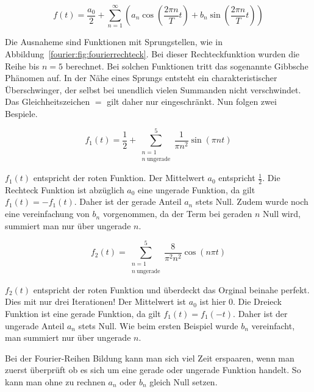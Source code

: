\begin{equation}
f(t) = \frac{a_0}{2} + \sum_{n=1}^{\infty} \left( a_n \cos\left( \frac{2\pi n}{T} t \right) + b_n \sin\left( \frac{2\pi n}{T} t \right) \right)
\end{equation}


Die Ausnaheme sind Funktionen mit Sprungstellen, wie in Abbildung~\ref{fourier:fig:fourierrechteck}.
Bei dieser Rechteckfunktion wurden die Reihe bis $n = 5$ berechnet. 
Bei solchen Funktionen tritt das sogenannte Gibbsche Phänomen auf.
In der Nähe eines Sprungs entsteht ein charakteristischer Überschwinger, der selbst bei unendlich vielen Summanden nicht verschwindet.
Das Gleichheitszeichen $=$ gilt daher nur eingeschränkt. 
Nun folgen zwei Bespiele.



\begin{equation}
	f_1(t) = \frac{1}{2} + \sum_{\substack{n=1 \\ n\ \text{ungerade}}}^{5} \frac{1}{\pi n^2} \sin\left( \pi n t \right)
\end{equation}

$f_1(t)$ entspricht der roten Funktion. 
Der Mittelwert $a_0$ entspricht $\frac{1}{2}$. 
Die Rechteck Funktion ist abzüglich $a_0$ eine ungerade Funktion, da gilt $f_1(t) = -f_1(t)$. 
Daher ist der gerade Anteil $a_n$ stets Null. 
Zudem wurde noch eine vereinfachung von $b_n$ vorgenommen, da der Term bei geraden $n$ Null wird, summiert man nur über ungerade $n$. 





\begin{equation}
	f_2(t) = \sum_{\substack{n=1 \\ n\ \text{ungerade}}}^{5} \frac{8}{\pi^2 n^2} \cos(n\pi t)
\end{equation}

$f_2(t)$ entspricht der roten Funktion und überdeckt das Orginal beinahe perfekt. 
Dies mit nur drei Iterationen!
Der Mittelwert ist $a_0$ ist hier 0. 
Die Dreieck Funktion ist eine gerade Funktion, da gilt $f_1(t) = f_1(-t)$. 
Daher ist der ungerade Anteil $a_n$ stets Null. 
Wie beim ersten Beispiel wurde $b_n$ vereinfacht, man summiert nur über ungerade $n$. 


Bei der Fourier-Reihen Bildung kann man sich viel Zeit erspaaren, wenn man zuerst überprüft ob es sich um eine gerade oder ungerade Funktion handelt.
So kann man ohne zu rechnen $a_n$ oder $b_n$ gleich Null setzen.




